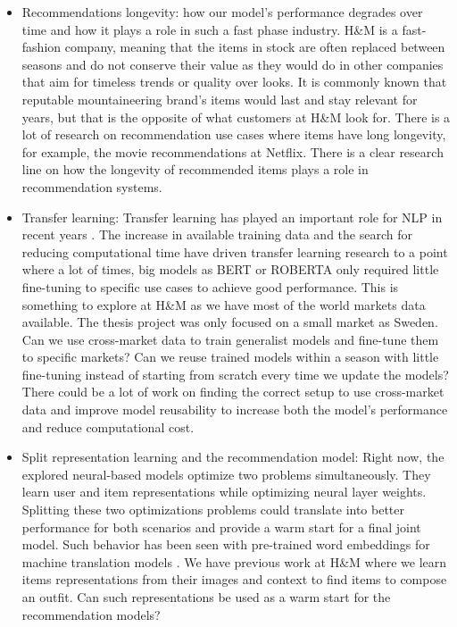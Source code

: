 \documentclass{kththesis}
\begin{document}
\begin{itemize}
    \item Recommendations longevity: how our model's performance degrades over time and how it plays a role in such a fast phase industry. H\&M is a fast-fashion company, meaning that the items in stock are often replaced between seasons and do not conserve their value as they would do in other companies that aim for timeless trends or quality over looks. It is commonly known that reputable mountaineering brand's items would last and stay relevant for years, but that is the opposite of what customers at H\&M look for. There is a lot of research on recommendation use cases where items have long longevity, for example, the movie recommendations at Netflix. There is a clear research line on how the longevity of recommended items plays a role in recommendation systems.
    
    \item Transfer learning: Transfer learning has played an important role for NLP in recent years \cite{ruder2019transfer}. The increase in available training data and the search for reducing computational time have driven transfer learning research to a point where a lot of times, big models as BERT or ROBERTA only required little fine-tuning to specific use cases to achieve good performance. This is something to explore at H\&M as we have most of the world markets data available. The thesis project was only focused on a small market as Sweden. Can we use cross-market data to train generalist models and fine-tune them to specific markets? Can we reuse trained models within a season with little fine-tuning instead of starting from scratch every time we update the models? There could be a lot of work on finding the correct setup to use cross-market data and improve model reusability to increase both the model's performance and reduce computational cost.
    
    \item Split representation learning and the recommendation model: Right now, the explored neural-based models optimize two problems simultaneously. They learn user and item representations while optimizing neural layer weights. Splitting these two optimizations problems could translate into better performance for both scenarios and provide a warm start for a final joint model. Such behavior has been seen with pre-trained word embeddings for machine translation models \cite{glove}. We have previous work at H\&M \cite{hm2vec} where we learn items representations from their images and context to find items to compose an outfit. Can such representations be used as a warm start for the recommendation models?
    

\end{itemize}
\end{document}
